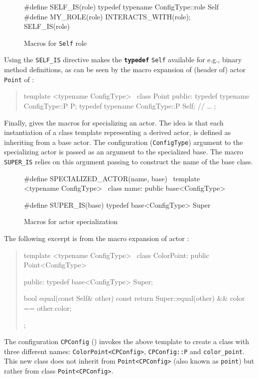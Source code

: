 \documentclass[11pt]{article}
\numberwithin{figure}{section}
\newcommand{\kw}[1]{\texttt{\textbf{#1}}}
\newcommand{\cd}[1]{\texttt{#1}}
\newenvironment{excerpt}{\begin{quote}\begin{minipage}\textwidth}{\end{minipage}\end{quote}}
\begin{document}
\begin{figure}[!htb]
\CPP
#define SELF_IS(role) typedef typename ConfigType::role Self
#define MY_ROLE(role) INTERACTS_WITH(role); SELF_IS(role)

\END\PROGcg{}%
\caption{Macros for \cd{Self} role}
\label{Figure:actor:self}
\end{figure}
Using the \cd{SELF\_IS} directive
    makes the \kw{typedef} \cd{Self}
    available for e.g., binary method definitions,
    as can be seen by the macro expansion of
    (header of) actor \cd{Point} of :
\begin{excerpt}
\CPP
template <typename ConfigType> \
        class Point { public:
            typedef typename ConfigType::P P;
            typedef typename ConfigType::P Self;
            //{} \ldots
};
\END\PROGch{}
\end{excerpt}

Finally,  gives
    the macros for specializing an actor.
The idea is that each instantiation
    of a class template representing
    a derived actor, is defined as inheriting
    from a base actor.
The configuration (\cd{ConfigType}) argument to the specializing
    actor is passed as an argument to the specialized base.
The macro \cd{SUPER\_IS} relies on this argument
    passing to construct the name of the base class.

\begin{figure}[!htb]
\CPP
#define SPECIALIZED_ACTOR(name, base) \
    template <typename ConfigType> \
        class name: public base<ConfigType>

#define SUPER_IS(base) typedef base<ConfigType> Super
\END\PROGci{}%
\caption{Macros for actor specialization}
\label{Figure:actor:specialization}
\end{figure}

The following excerpt is from the macro expansion
    of actor :
\begin{excerpt}
\CPP
template <typename ConfigType> \
     class ColorPoint: public Point<ConfigType> { public:
            typedef base<ConfigType> Super;

            bool equal(const Self& other) const {
                 return Super::equal(other) && color == other.color;}
};
\END\PROGcj{}
\end{excerpt}
The configuration \cd{CPConfig} (\Ref{Figure}{cpoint:configuration})
    invokes the above template to create a class with three different names:
     \cd{ColorPoint<CPConfig>}, \cd{CPConfig::P} and \cd{color\_point}.
This new class does not inherit from
        \cd{Point<CPConfig>} (also known as \cd{point})
        but rather from class \cd{Point<CPConfig>}.
\end{document}
